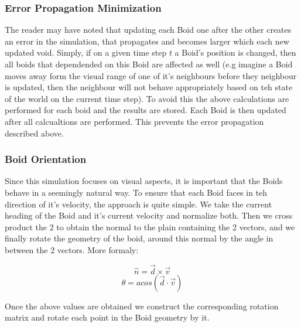 \documentclass[12pt]{article}
\begin{document}
\subsubsection{Error Propagation Minimization}
The reader may have noted that updating each Boid one after the other creates an error in the simulation, that propagates and becomes larger which each new updated void. Simply, if on a given time step $t$ a Boid's position is changed, then all boids that dependended on this Boid are affected as well (e.g imagine a Boid moves away form the visual range of one of it's neighbours before they neighbour is updated, then the neighbour will not behave appropriately based on teh state of the world on the current time step). To avoid this the above calculations are performed for each boid and the results are stored.  Each Boid is then updated after all calcualtions are performed. This prevents the error propagation described above.

\subsubsection{Boid Orientation}
Since this simulation focuses on visual aspects, it is important that the Boids behave in a seemingly natural way. To ensure that each Boid faces in teh direction of it's velocity, the approach is quite simple. We take the current heading of the Boid and it's current velocity and normalize both. Then we cross product the 2 to obtain the normal to the plain containing the 2 vectors, and we finally rotate the geometry of the boid, around this normal by the angle in between the 2 vectors. More formaly:

$$\hat{n}=\vec{d}\times \vec{v}$$
$$\theta = acos(\vec{d}\cdot\vec{v})$$

Once the above values are obtained we construct the corresponding rotation matrix and rotate each point in the Boid geometry by it.
\end{document}
